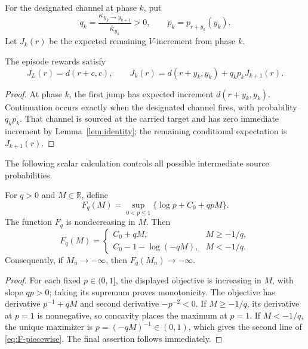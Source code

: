 For the designated channel at phase \(k\), put
\begin{equation}\label{eq:qk}
 q_k=\frac{\kappa_{y_k\to y_{k+1}}}{\bar\kappa_{y_k}}>0,
 \qquad p_k=p_{r+y_k}(y_k).
\end{equation}
Let \(J_k(r)\) be the expected remaining \(V\)-increment from phase \(k\).

\begin{lemma}\label{lem:recursion}
The episode rewards satisfy
\begin{equation}\label{eq:recursion}
  J_L(r)=d(r+c,c),
  \qquad
  J_k(r)=d(r+y_k,y_k)+q_kp_kJ_{k+1}(r).
\end{equation}
\end{lemma}

\begin{proof}
At phase \(k\), the first jump has expected increment
\(d(r+y_k,y_k)\).  Continuation occurs exactly when the designated channel
fires, with probability \(q_kp_k\).  That channel is sourced at the carried
target and has zero immediate increment by Lemma~\ref{lem:identity}; the
remaining conditional expectation is \(J_{k+1}(r)\).
\end{proof}

The following scalar calculation controls all possible intermediate source
probabilities.

\begin{lemma}\label{lem:envelope}
For \(q>0\) and \(M\in\mathbb R\), define
\[
  F_q(M)=\sup_{0<p\le1}\{\log p+C_0+qpM\}.
\]
The function \(F_q\) is nondecreasing in \(M\).
Then
\begin{equation}\label{eq:F-piecewise}
  F_q(M)=
  \begin{cases}
    C_0+qM,&M\ge-1/q,\\
    C_0-1-\log(-qM),&M<-1/q.
  \end{cases}
\end{equation}
Consequently, if \(M_n\to-\infty\), then \(F_q(M_n)\to-\infty\).
\end{lemma}

\begin{proof}
For each fixed \(p\in(0,1]\), the displayed objective is increasing in
\(M\), with slope \(qp>0\); taking its supremum proves monotonicity.
The objective has derivative \(p^{-1}+qM\) and second derivative
\(-p^{-2}<0\).  If \(M\ge-1/q\), its derivative at \(p=1\) is nonnegative,
so concavity places the maximum at \(p=1\).  If \(M<-1/q\), the unique
maximizer is \(p=(-qM)^{-1}\in(0,1)\), which gives the second line of
\eqref{eq:F-piecewise}.  The final assertion follows immediately.
\end{proof}

